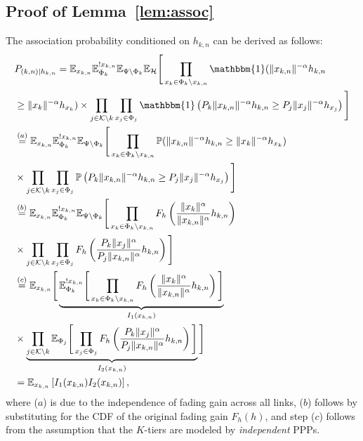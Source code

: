 \documentclass[final]{IEEEtran}
\begin{document}
\subsection{Proof of Lemma~\ref{lem:assoc}}\label{app:assoc}
The association probability conditioned on $h_{k,n}$ can be derived as follows:
\begin{align}
\label{Eq_lemma_1_proof}
&P_{(k,n)|h_{k,n}}=\mathbb{E}_{x_{k,n}}\mathbb{E}_{\Phi_k}^{{!x_{k,n}}}\mathbb{E}_{\Psi\backslash\Phi_k}\mathbb{E}_{\mathcal{H}}\Bigg[\prod_{x_k\in\Phi_k\backslash x_{k,n}}\mathbbm{1}(\|x_{k,n}\|^{-\alpha}h_{k,n}\nonumber\\ &\geq\|x_k\|^{-\alpha}h_{x_k})\times\prod_{j\in\mathcal{K}\backslash k}\prod_{x_j\in\Phi_j}\mathbbm{1}\left(P_k\|x_{k,n}\|^{-\alpha}h_{k,n}\geq P_j\|x_j\|^{-\alpha}h_{x_j}\right)\Bigg]\nonumber\\
&\stackrel{(a)}{=}\mathbb{E}_{x_{k,n}}\mathbb{E}_{\Phi_k}^{{!x_{k,n}}}\mathbb{E}_{\Psi\backslash\Phi_k}\Bigg[\prod_{x_k\in\Phi_k\backslash x_{k,n}}\mathbb{P}(\|x_{k,n}\|^{-\alpha}h_{k,n}\geq\|x_k\|^{-\alpha}h_{x_k})\nonumber\\ &\times\prod_{j\in\mathcal{K}\backslash k}\prod_{x_j\in\Phi_j}\mathbb{P}\left(P_k\|x_{k,n}\|^{-\alpha}h_{k,n}\geq P_j\|x_j\|^{-\alpha}h_{x_j}\right)\Bigg]\nonumber\\
&\stackrel{(b)}{=}\mathbb{E}_{x_{k,n}}\mathbb{E}_{\Phi_k}^{{!x_{k,n}}}\mathbb{E}_{\Psi\backslash\Phi_k}\Bigg[\prod_{x_k\in\Phi_k\backslash x_{k,n}}F_h\left(\frac{\|x_k\|^{\alpha}}{\|x_{k,n}\|^{\alpha}}h_{k,n}\right)\nonumber\\ &\times\prod_{j\in\mathcal{K}\backslash k}\prod_{x_j\in\Phi_j}F_h\left(\frac{P_k\|x_j\|^{\alpha}}{P_j\|x_{k,n}\|^{\alpha}}h_{k,n}\right)\Bigg]\nonumber\\
&\stackrel{(c)}{=}\mathbb{E}_{x_{k,n}}\Bigg[
\underbrace{\mathbb{E}_{\Phi_k}^{{!x_{k,n}}}\Bigg[\prod_{x_k\in\Phi_k\backslash x_{k,n}}F_h\left(\frac{\|x_k\|^{\alpha}}{\|x_{k,n}\|^{\alpha}}h_{k,n}\right)\Bigg]}_{I_1(x_{k,n})}\nonumber\\ 
&\times \underbrace{\prod_{j\in\mathcal{K}\backslash k}\mathbb{E}_{\Phi_j}\Bigg[\prod_{x_j\in\Phi_j}F_h\left(\frac{P_k\|x_j\|^{\alpha}}{P_j\|x_{k,n}\|^{\alpha}}h_{k,n}\right)\Bigg]}_{I_2(x_{k,n})}
\Bigg] \nonumber \\
&=\mathbb{E}_{x_{k,n}}\left[I_1(x_{k,n})I_2(x_{k,n})\right],
\end{align}
where ($a$) is due to the independence of fading gain across all links, ($b$) follows by substituting for the CDF of the original fading gain $F_h(h)$, and step ($c$) follows from the assumption that the $K$-tiers are modeled by {\em independent} PPPs. %
\end{document}
